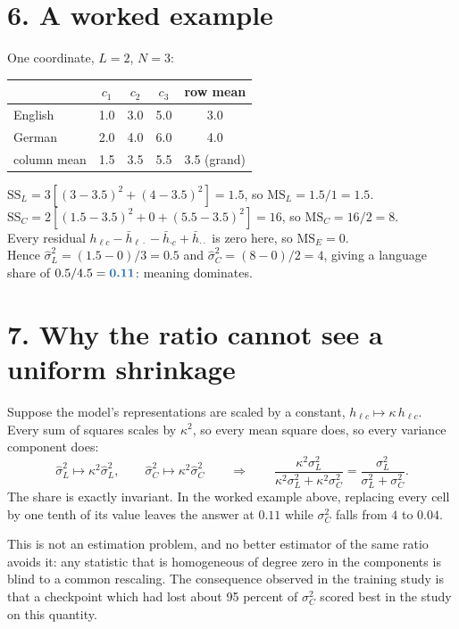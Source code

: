 \documentclass[11pt]{article}
\newcommand{\Hi}[1]{{\color[HTML]{2B6CB0}\textbf{#1}}}
\begin{document}
\section*{6. A worked example}
One coordinate, $L=2$, $N=3$:
\begin{center}
\begin{tabular}{l|ccc|c}
 & $c_1$ & $c_2$ & $c_3$ & row mean\\
\hline
English & 1.0 & 3.0 & 5.0 & 3.0\\
German  & 2.0 & 4.0 & 6.0 & 4.0\\
\hline
column mean & 1.5 & 3.5 & 5.5 & 3.5 (grand)\\
\end{tabular}
\end{center}
$\mathrm{SS}_L = 3[(3-3.5)^2 + (4-3.5)^2] = 1.5$, so
$\mathrm{MS}_L = 1.5/1 = 1.5$. \\
$\mathrm{SS}_C = 2[(1.5-3.5)^2 + 0 + (5.5-3.5)^2] = 16$, so
$\mathrm{MS}_C = 16/2 = 8$. \\
Every residual $h_{\ell c} - \bar h_{\ell\cdot} - \bar h_{\cdot c} +
\bar h_{\cdot\cdot}$ is zero here, so $\mathrm{MS}_E = 0$. \\[4pt]
Hence $\hat\sigma^2_L = (1.5-0)/3 = 0.5$ and
$\hat\sigma^2_C = (8-0)/2 = 4$, giving a language share of
$0.5/4.5 = \Hi{0.11}$: meaning dominates.

\section*{7. Why the ratio cannot see a uniform shrinkage}
Suppose the model's representations are scaled by a constant,
$h_{\ell c} \mapsto \kappa\, h_{\ell c}$. Every sum of squares scales
by $\kappa^2$, so every mean square does, so every variance component
does:
\[
\hat\sigma^2_L \mapsto \kappa^2 \hat\sigma^2_L, \qquad
\hat\sigma^2_C \mapsto \kappa^2 \hat\sigma^2_C
\qquad\Longrightarrow\qquad
\frac{\kappa^2\sigma^2_L}{\kappa^2\sigma^2_L + \kappa^2\sigma^2_C}
= \frac{\sigma^2_L}{\sigma^2_L + \sigma^2_C} .
\]
The share is exactly invariant. In the worked example above, replacing
every cell by one tenth of its value leaves the answer at $0.11$ while
$\sigma^2_C$ falls from $4$ to $0.04$.

This is not an estimation problem, and no better estimator of the same
ratio avoids it: any statistic that is homogeneous of degree zero in
the components is blind to a common rescaling. The consequence observed
in the training study is that a checkpoint which had lost about 95
percent of $\sigma^2_C$ scored best in the study on this quantity.
\end{document}
